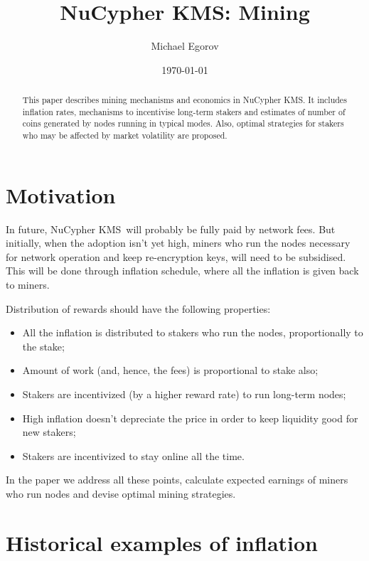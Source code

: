 \documentclass[longbibliography,nofootinbib,twocolumn]{revtex4-1}
\newcommand{\kms}{NuCypher KMS}
\begin{document}
\title{\kms: Mining}

\author{Michael Egorov}

\begin{abstract}
    This paper describes mining mechanisms and economics in \kms.
    It includes inflation rates, mechanisms to incentivise long-term stakers
    and estimates of number of coins generated by nodes running in typical modes.
    Also, optimal strategies for stakers who may be affected by market volatility are proposed.
\end{abstract}

\date{\today}
\maketitle

\section{Motivation}

In future, \kms~will probably be fully paid by network fees.
But initially, when the adoption isn't yet high, miners who run the nodes necessary for network operation and keep re-encryption keys,
will need to be subsidised.
This will be done through inflation schedule, where all the inflation is given back to miners.

Distribution of rewards should have the following properties:
\begin{itemize}
    \item All the inflation is distributed to stakers who run the nodes, proportionally to the stake;
    \item Amount of work (and, hence, the fees) is proportional to stake also;
    \item Stakers are incentivized (by a higher reward rate) to run long-term nodes;
    \item High inflation doesn't depreciate the price in order to keep liquidity good for new stakers;
    \item Stakers are incentivized to stay online all the time.
\end{itemize}

In the paper we address all these points, calculate expected earnings of miners who run nodes and devise optimal mining strategies.

\section{Historical examples of inflation}
\end{document}
